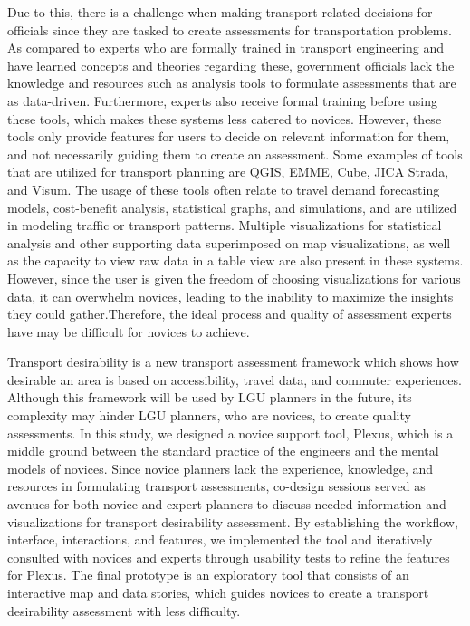 \documentclass{sigchi}
\begin{document}
Due to this, there is a challenge when making transport-related decisions for officials since they are tasked to create assessments for transportation problems. As compared to experts who are formally trained in transport engineering and have learned concepts and theories regarding these, government officials lack the knowledge and resources such as analysis tools to formulate assessments that are as data-driven. Furthermore, experts also receive formal training before using these tools, which makes these systems less catered to novices. However, these tools only provide features for users to decide on relevant information for them, and not necessarily guiding them to create an assessment. Some examples of tools that are utilized for transport planning are QGIS, EMME, Cube, JICA Strada, and Visum. The usage of these tools often relate to travel demand forecasting models, cost-benefit analysis, statistical graphs, and simulations, and are utilized in modeling traffic or transport patterns. Multiple visualizations for statistical analysis and other supporting data superimposed on map visualizations, as well as the capacity to view raw data in a table view are also present in these systems. However, since the user is given the freedom of choosing visualizations for various data, it can overwhelm novices, leading to the inability to maximize the insights they could gather.Therefore, the ideal process and quality of assessment experts have may be difficult for novices to achieve.

Transport desirability is a new transport assessment framework which shows how desirable an area is based on accessibility, travel data, and commuter experiences. Although this framework will be used by LGU planners in the future, its complexity may hinder LGU planners, who are novices, to create quality assessments. In this study, we designed a novice support tool, Plexus, which is a middle ground between the standard practice of the engineers and the mental models of novices. Since novice planners lack the experience, knowledge, and resources in formulating transport assessments, co-design sessions served as avenues for both novice and expert planners to discuss needed information and visualizations for transport desirability assessment.  By establishing the workflow, interface, interactions, and features, we implemented the tool and iteratively consulted with novices and experts through usability tests to refine the features for Plexus. The final prototype is an exploratory tool that consists of an interactive map and data stories, which guides novices to create a transport desirability assessment with less difficulty.
\end{document}
